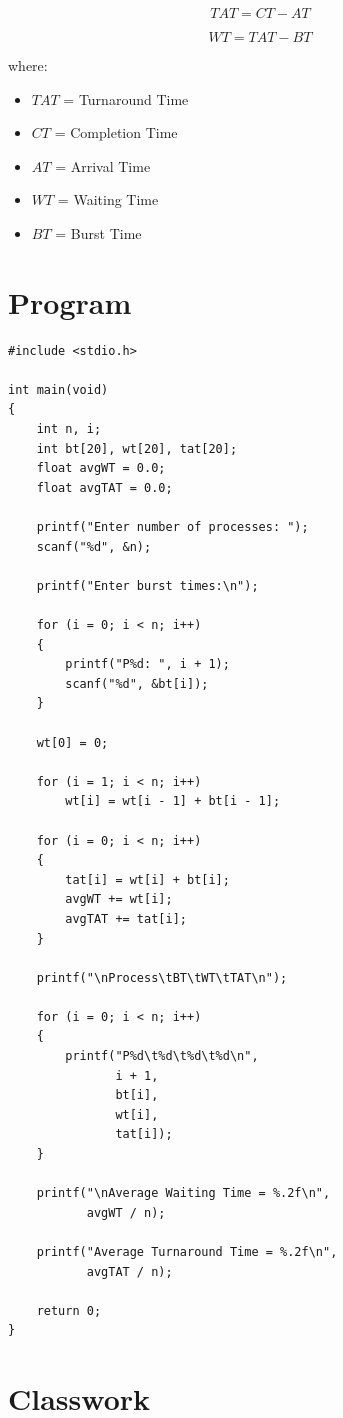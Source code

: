 \documentclass[12pt,a4paper]{report}
\begin{document}
\[
TAT = CT - AT
\]

\[
WT = TAT - BT
\]

where:

\begin{itemize}
    \item $TAT$ = Turnaround Time
    \item $CT$ = Completion Time
    \item $AT$ = Arrival Time
    \item $WT$ = Waiting Time
    \item $BT$ = Burst Time
\end{itemize}

\section*{Program}

\begin{lstlisting}
#include <stdio.h>

int main(void)
{
    int n, i;
    int bt[20], wt[20], tat[20];
    float avgWT = 0.0;
    float avgTAT = 0.0;

    printf("Enter number of processes: ");
    scanf("%d", &n);

    printf("Enter burst times:\n");

    for (i = 0; i < n; i++)
    {
        printf("P%d: ", i + 1);
        scanf("%d", &bt[i]);
    }

    wt[0] = 0;

    for (i = 1; i < n; i++)
        wt[i] = wt[i - 1] + bt[i - 1];

    for (i = 0; i < n; i++)
    {
        tat[i] = wt[i] + bt[i];
        avgWT += wt[i];
        avgTAT += tat[i];
    }

    printf("\nProcess\tBT\tWT\tTAT\n");

    for (i = 0; i < n; i++)
    {
        printf("P%d\t%d\t%d\t%d\n",
               i + 1,
               bt[i],
               wt[i],
               tat[i]);
    }

    printf("\nAverage Waiting Time = %.2f\n",
           avgWT / n);

    printf("Average Turnaround Time = %.2f\n",
           avgTAT / n);

    return 0;
}
\end{lstlisting}

\section*{Classwork}
\end{document}
